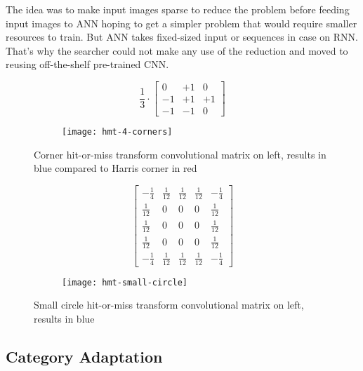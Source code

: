 The idea was to make input images sparse to reduce the problem before feeding input images to ANN
hoping to get a simpler problem that would require smaller resources to train.
But ANN takes fixed-sized input or sequences in case on RNN.
That's why the searcher could not make any use of the reduction and
moved to reusing off-the-shelf pre-trained CNN.

\begin{figure}[!htbp]
\centering
    \begin{subfigure}[t]{0.32\textwidth}
        \centering
\[
\frac{1}{3} \cdot
\begin{bmatrix}
0 & +1 & 0 \\
-1 & +1 & +1 \\
-1 & -1 & 0 
\end{bmatrix}
\]
    \end{subfigure}
    \begin{subfigure}[b]{0.65\textwidth}
        \centering
        \texttt{[image: hmt-4-corners]}
    \end{subfigure}
\caption{Corner hit-or-miss transform convolutional matrix on left, results in blue compared to Harris corner in red}\label{fig:hmt-corner}
\end{figure}

\begin{figure}[!htbp]
\centering
    \begin{subfigure}[b]{0.32\textwidth}
        \centering
\[
\begin{bmatrix}
-\frac{1}{4} & \frac{1}{12} & \frac{1}{12} & \frac{1}{12} & -\frac{1}{4} \\
\frac{1}{12} & 0 & 0 & 0 & \frac{1}{12} \\
\frac{1}{12} & 0 & 0 & 0 & \frac{1}{12} \\
\frac{1}{12} & 0 & 0 & 0 & \frac{1}{12} \\
-\frac{1}{4} & \frac{1}{12} & \frac{1}{12} & \frac{1}{12} & -\frac{1}{4}
\end{bmatrix}
\]
    \end{subfigure}
    \begin{subfigure}[b]{0.65\textwidth}
        \centering
        \texttt{[image: hmt-small-circle]}
    \end{subfigure}
\caption{Small circle hit-or-miss transform convolutional matrix on left, results in blue}\label{fig:hmt-circle}
\end{figure}

\subsection{Category Adaptation}

